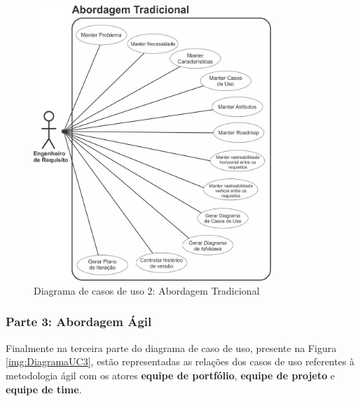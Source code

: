 \begin{figure}[H]
	\centering
	\includegraphics[width=0.8\textwidth]{imgModelagem/DiagramaUC2}
	\caption{Diagrama de casos de uso 2: Abordagem Tradicional}
	\label{img:DiagramaUC2}
\end{figure}

\subsubsection{Parte 3: Abordagem Ágil}
	Finalmente na terceira parte do diagrama de caso de uso, presente na Figura \ref{img:DiagramaUC3}, estão representadas as relações dos casos de uso referentes à metodologia ágil com os atores \textbf{equipe de portfólio}, \textbf{equipe de projeto} e \textbf{equipe de time}.

